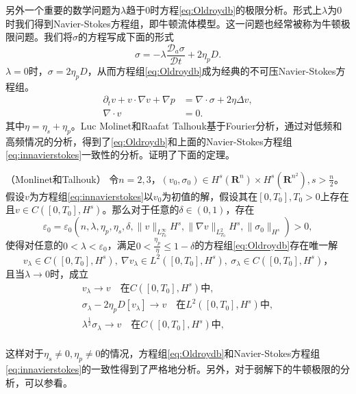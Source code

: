 另外一个重要的数学问题为$\lambda$趋于$0$时方程\eqref{eq:Oldroydb}的极限分析。形式上$\lambda$为$0$时我们得到Navier-Stokes方程组，即牛顿流体模型。这一问题也经常被称为牛顿极限问题。我们将$\sigma$的方程写成下面的形式
\begin{equation*}
	 \sigma = -	\lambda \frac{\mathcal{D}_a \sigma}{\mathcal{D} t} +  2 \eta_p D.
\end{equation*}
$\lambda=0$时，$\sigma= 2 \eta_p D$，从而方程组\eqref{eq:Oldroydb}成为经典的不可压Navier-Stokes方程组。
\begin{subequations} \label{eq:innavierstokes}
\begin{align}
	\partial_t v + v \cdot \nabla v  + \nabla p &= \nabla \cdot \sigma + 2 \eta \Delta v, \\
	\nabla \cdot v &= 0.
\end{align}
\end{subequations}
其中$\eta= \eta_s + \eta_p$。Luc Molinet和Raafat Talhouk基于Fourier分析，通过对低频和高频情况的分析，得到了\eqref{eq:Oldroydb}和上面的Navier-Stokes方程组\eqref{eq:innavierstokes}一致性的分析。证明了下面的定理。
\begin{theorem}（Monlinet和Talhouk\cite{molinet2008newtonian}）
	令$n=2,3$，$(v_0,\sigma_0) \in H^s(\mathbf{R}^n) \times H^s(\mathbf{R}^{n^2}), s>\frac{n}{2}$。假设$v$为方程组\eqref{eq:innavierstokes}以$v_0$为初值的解，假设其在$[0,T_0],T_0>0$上存在且$v \in C([0,T_0],H^s)$。那么对于任意的$\delta \in (0,1)$，存在
	\begin{equation*}
		\varepsilon_0 = \varepsilon_0 (n,\lambda,\eta_p,\eta_s,\delta, \|v\|_{L_{T_0}^\infty}H^s, \|\nabla v\|_{L^2_{T_0}}H^s, \|\sigma_0\|_{H^s}) >0,
	\end{equation*}
	使得对任意的$0 < \lambda < \varepsilon_0$，满足$0 < \frac{\eta_p}{\eta} \le 1- \delta$的方程组\eqref{eq:Oldroydb}存在唯一解
	\begin{equation*}
		v_\lambda \in C([0,T_0],H^s),\ \nabla v_{\lambda} \in L^2([0,T_0],H^s), \ \sigma_{\lambda} \in C ([0,T_0],H^s)，
	\end{equation*}
	且当$\lambda \rightarrow 0$时，成立
	\begin{eqnarray*}
		v_\lambda \rightarrow v \quad \text{在} C([0,T_0],H^s) \text{中}, \\ 
		\sigma_\lambda - 2\eta_p D[v_\lambda]  \rightarrow v \quad \text{在} L^2([0,T_0],H^s) \text{中}, \\ 
		\lambda^{\frac{1}{2}} \sigma_\lambda \rightarrow v \quad \text{在} C([0,T_0],H^s) \text{中}, \\ 
	\end{eqnarray*}
\end{theorem}
这样对于$\eta_s \neq 0, \eta_p \neq 0$的情况，方程组\eqref{eq:Oldroydb}和Navier-Stokes方程组\eqref{eq:innavierstokes}的一致性得到了严格地分析。另外，对于弱解下的牛顿极限的分析，可以参看\cite{bresch2014newtonian}。


